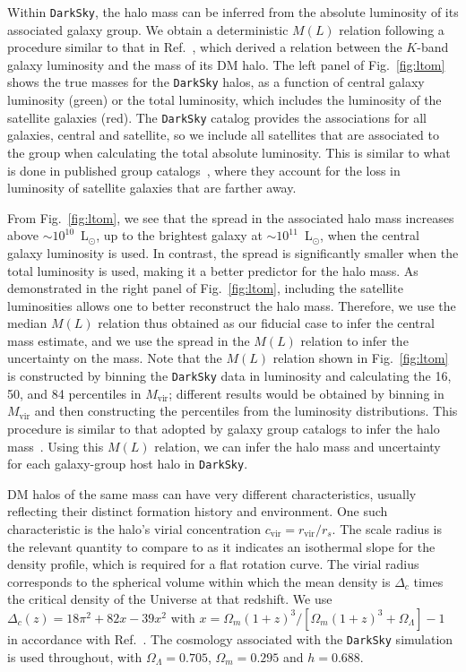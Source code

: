 Within \texttt{DarkSky}, the halo mass can be inferred from the absolute luminosity of its associated galaxy group.  We obtain a deterministic $M(L)$ relation following a procedure similar to that in Ref.~\cite{Vale:2005mw}, which derived a relation between the $K$-band galaxy luminosity and the mass of its DM halo.  The left panel of Fig.~\ref{fig:ltom} shows the true masses for the \texttt{DarkSky} halos, as a function of central galaxy luminosity (green) or the total luminosity, which includes the luminosity of the satellite galaxies (red).  The \texttt{DarkSky} catalog provides the associations for all galaxies, central and satellite, so we include all satellites that are associated to the group when calculating the total absolute luminosity. This is similar to what is done in published group catalogs~\cite{Tully:2015opa,2017ApJ...843...16K,Lu:2016vmu}, where they account for the loss in luminosity of satellite galaxies that are farther away.  

From Fig.~\ref{fig:ltom}, we see that the spread in the associated halo mass increases above $\sim10^{10}$~L$_\odot$, up to the brightest galaxy at $\sim10^{11}$~L$_\odot$, when the central galaxy luminosity is used.  In contrast, the spread is significantly smaller when the total luminosity is used, making it a better predictor for the halo mass.  As demonstrated in the right panel of Fig.~\ref{fig:ltom}, including the satellite luminosities allows one to better reconstruct the halo mass.  Therefore, we use the median $M(L)$ relation thus obtained as our fiducial case to infer the central mass estimate, and we use the spread in the $M(L)$ relation to infer the uncertainty on the mass.  Note that the $M(L)$ relation shown in Fig.~\ref{fig:ltom} is constructed by binning the \texttt{DarkSky} data in luminosity and calculating the 16, 50, and 84 percentiles in $M_\text{vir}$; different results would be obtained by binning in $M_\text{vir}$ and then constructing the percentiles from the luminosity distributions.   This procedure is similar to that adopted by galaxy group catalogs to infer the halo mass~\cite{Tully:2015opa,Lu:2016vmu,2017ApJ...843...16K}. Using this $M(L)$ relation, we can infer the halo mass and uncertainty  for each galaxy-group host halo in \texttt{DarkSky}. 

DM halos of the same mass can have very different characteristics, usually reflecting their distinct formation history and environment.  One such characteristic is the halo's virial concentration $c_\text{vir} = r_\text{vir}/r_s$. 
The scale radius is the relevant quantity to compare to as it indicates an isothermal slope for the density profile, which is required for a flat rotation curve.  The virial radius corresponds to the spherical volume within which the mean density is $\Delta_{c}$ times the critical density of the Universe at that redshift. We use $\Delta_c(z) = 18\pi^2 +82x-39x^2$ with $x = \Omega_{m}(1+z)^3/[\Omega_{m}(1+z)^3 + \Omega_{\Lambda}]-1$ in accordance with Ref.~\cite{Bryan:1997dn}.  The cosmology associated with the \texttt{DarkSky} simulation is used throughout, with $\Omega_\Lambda = 0.705$,  $\Omega_m = 0.295$ and $h = 0.688$. 

